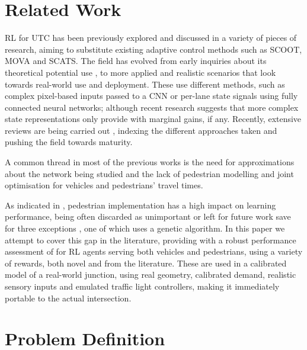 \documentclass[conference]{IEEEtran}
\begin{document}
\section{Related Work}
\label{lit}
RL for UTC has been previously explored and discussed in a variety of pieces of research, aiming to substitute existing adaptive control methods such as SCOOT\cite{scoot}, MOVA\cite{mova} and SCATS\cite{scats}.
The field has evolved from early inquiries about its theoretical potential use \cite{wiering2000} \cite{abdul2003} \cite{pra2010} \cite{abdulhai2010} \cite{abdoos2011}, to more applied and realistic scenarios \cite{survey2014} \cite{genders2016} \cite{liang2017} \cite{gendersthesis} \cite{gao2017} \cite{mousavi2017} \cite{wan2018} \cite{liang2018} \cite{aslani2019} \cite{genders2019} that look towards real-world use and deployment.
These use different methods, such as complex pixel-based inputs passed to a CNN or per-lane state signals using fully connected neural networks; although recent research suggests that more complex state representations only provide with marginal gains, if any\cite{gendersstate}.
Recently, extensive reviews are being carried out \cite{mannion} \cite{survey2020} \cite{survey2020wei}, indexing the different approaches taken and pushing the field towards maturity.

A common thread in most of the previous works is the need for approximations about the network being studied and the lack of pedestrian modelling and joint optimisation for vehicles and pedestrians' travel times.

As indicated in \cite{survey2020}, pedestrian implementation has a high impact on learning performance, being often discarded as unimportant or left for future work save for three exceptions \cite{geneticped} \cite{liu2017} \cite{chen2020}, one of which uses a genetic algorithm.
In this paper we attempt to cover this gap in the literature, providing with a robust performance assessment of for RL agents serving both vehicles and pedestrians, using a variety of rewards, both novel and from the literature.
These are used in a calibrated model of a real-world junction, using real geometry, calibrated demand, realistic sensory inputs and emulated traffic light controllers, making it immediately portable to the actual intersection.
\section{Problem Definition}
\label{problem}
\end{document}
